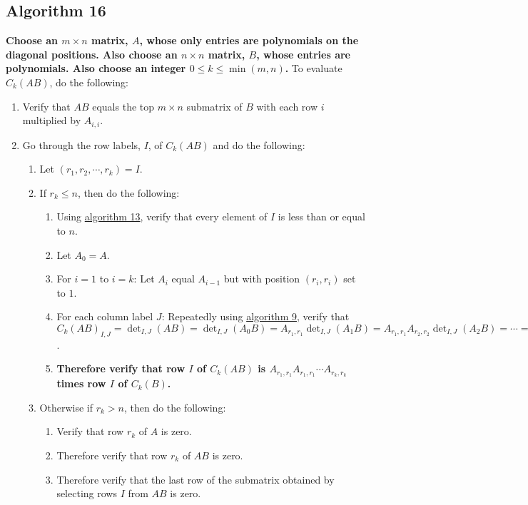 \documentclass[twocolumn]{article}
\begin{document}
		\subsection{Algorithm 16}\label{sec:algorithm 16}
			\textbf{Choose an $m\times n$ matrix, $A$, whose only entries are polynomials on the diagonal positions. Also choose an $n\times n$ matrix, $B$, whose entries are polynomials. Also choose an integer $0\le k\le\min(m,n)$.} To evaluate $C_k(AB)$, do the following:
			\begin{enumerate}
				\item Verify that $AB$ equals the top $m\times n$ submatrix of $B$ with each row $i$ multiplied by $A_{i,i}$.
				\item Go through the row labels, $I$, of $C_k(AB)$ and do the following:
				\begin{enumerate}
					\item Let $(r_1, r_2, \cdots, r_k)=I$.
					\item If $r_k\le n$, then do the following:
					\begin{enumerate}
						\item Using \hyperref[sec:algorithm 13]{algorithm 13}, verify that every element of $I$ is less than or equal to $n$.
						\item Let $A_0=A$.
						\item For $i=1$ to $i=k$: Let $A_i$ equal $A_{i-1}$ but with position $(r_i,r_i)$ set to $1$.
						\item For each column label $J$: Repeatedly using \hyperref[sec:algorithm 9]{algorithm 9}, verify that ${C_k(AB)}_{I,J}=\det_{I,J}(AB)=\det_{I,J}(A_0B)=A_{r_1,r_1}\det_{I,J}(A_1B)=A_{r_1,r_1}A_{r_2,r_2}\det_{I,J}(A_2B)=\cdots=A_{r_1,r_1}A_{r_2,r_2}\cdots A_{r_k,r_k}\det_{I,J}(A_kB)=A_{r_1,r_1}A_{r_2,r_2}\cdots A_{r_k,r_k}\det_{I,J}(B)=A_{r_1,r_1}A_{r_2,r_2}\cdots A_{r_k,r_k}{C_k(B)}_{I,J}$.
						\item \textbf{Therefore verify that row $I$ of $C_k(AB)$ is $A_{r_1,r_1}A_{r_1,r_1}\cdots A_{r_k,r_k}$ times row $I$ of $C_k(B)$.}
					\end{enumerate}
					\item Otherwise if $r_k>n$, then do the following:
					\begin{enumerate}
						\item Verify that row $r_k$ of $A$ is zero.
						\item Therefore verify that row $r_k$ of $AB$ is zero.
						\item Therefore verify that the last row of the submatrix obtained by selecting rows $I$ from $AB$ is zero.

\end{enumerate}
\end{enumerate}
\end{enumerate}
\end{document}
